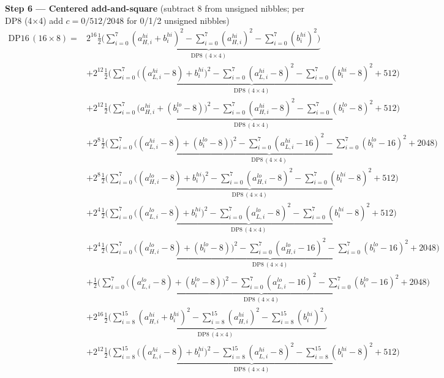 \documentclass[fleqn]{article}
\newcommand{\DPop}[3]{\mathrm{DP#1}\,(#2\!\times\!#3)}
\begin{document}
\textbf{Step 6 --- Centered add-and-square}\quad
{\small(subtract $8$ from unsigned nibbles; per DP8 (4$\times$4) add $c=0/512/2048$ for 0/1/2 unsigned nibbles)}
\begin{align*}
\DPop{16}{16}{8} = {}
  & 2^{16}\underbrace{\tfrac12\Big(\sum_{i=0}^{7}(a_{H,i}^{hi}{+}b_i^{hi})^2 - \sum_{i=0}^{7}(a_{H,i}^{hi})^2 - \sum_{i=0}^{7}(b_i^{hi})^2\Big)}_{\DPop{8}{4}{4}} \\[0.4em]
  & + 2^{12}\underbrace{\tfrac12\Big(\sum_{i=0}^{7}\big((a_{L,i}^{hi}{-}8){+}b_i^{hi}\big)^2 - \sum_{i=0}^{7}(a_{L,i}^{hi}{-}8)^2 - \sum_{i=0}^{7}(b_i^{hi}{-}8)^2 + 512\Big)}_{\DPop{8}{4}{4}} \\[0.4em]
  & + 2^{12}\underbrace{\tfrac12\Big(\sum_{i=0}^{7}\big(a_{H,i}^{hi}{+}(b_i^{lo}{-}8)\big)^2 - \sum_{i=0}^{7}(a_{H,i}^{hi}{-}8)^2 - \sum_{i=0}^{7}(b_i^{lo}{-}8)^2 + 512\Big)}_{\DPop{8}{4}{4}} \\[0.4em]
  & + 2^{8}\underbrace{\tfrac12\Big(\sum_{i=0}^{7}\big((a_{L,i}^{hi}{-}8){+}(b_i^{lo}{-}8)\big)^2 - \sum_{i=0}^{7}(a_{L,i}^{hi}{-}16)^2 - \sum_{i=0}^{7}(b_i^{lo}{-}16)^2 + 2048\Big)}_{\DPop{8}{4}{4}} \\[0.4em]
  & + 2^{8}\underbrace{\tfrac12\Big(\sum_{i=0}^{7}\big((a_{H,i}^{lo}{-}8){+}b_i^{hi}\big)^2 - \sum_{i=0}^{7}(a_{H,i}^{lo}{-}8)^2 - \sum_{i=0}^{7}(b_i^{hi}{-}8)^2 + 512\Big)}_{\DPop{8}{4}{4}} \\[0.4em]
  & + 2^{4}\underbrace{\tfrac12\Big(\sum_{i=0}^{7}\big((a_{L,i}^{lo}{-}8){+}b_i^{hi}\big)^2 - \sum_{i=0}^{7}(a_{L,i}^{lo}{-}8)^2 - \sum_{i=0}^{7}(b_i^{hi}{-}8)^2 + 512\Big)}_{\DPop{8}{4}{4}} \\[0.4em]
  & + 2^{4}\underbrace{\tfrac12\Big(\sum_{i=0}^{7}\big((a_{H,i}^{lo}{-}8){+}(b_i^{lo}{-}8)\big)^2 - \sum_{i=0}^{7}(a_{H,i}^{lo}{-}16)^2 - \sum_{i=0}^{7}(b_i^{lo}{-}16)^2 + 2048\Big)}_{\DPop{8}{4}{4}} \\[0.4em]
  & + \underbrace{\tfrac12\Big(\sum_{i=0}^{7}\big((a_{L,i}^{lo}{-}8){+}(b_i^{lo}{-}8)\big)^2 - \sum_{i=0}^{7}(a_{L,i}^{lo}{-}16)^2 - \sum_{i=0}^{7}(b_i^{lo}{-}16)^2 + 2048\Big)}_{\DPop{8}{4}{4}} \\[0.4em]
  & + 2^{16}\underbrace{\tfrac12\Big(\sum_{i=8}^{15}(a_{H,i}^{hi}{+}b_i^{hi})^2 - \sum_{i=8}^{15}(a_{H,i}^{hi})^2 - \sum_{i=8}^{15}(b_i^{hi})^2\Big)}_{\DPop{8}{4}{4}} \\[0.4em]
  & + 2^{12}\underbrace{\tfrac12\Big(\sum_{i=8}^{15}\big((a_{L,i}^{hi}{-}8){+}b_i^{hi}\big)^2 - \sum_{i=8}^{15}(a_{L,i}^{hi}{-}8)^2 - \sum_{i=8}^{15}(b_i^{hi}{-}8)^2 + 512\Big)}_{\DPop{8}{4}{4}} \\[0.4em]

\end{align*}
\end{document}

